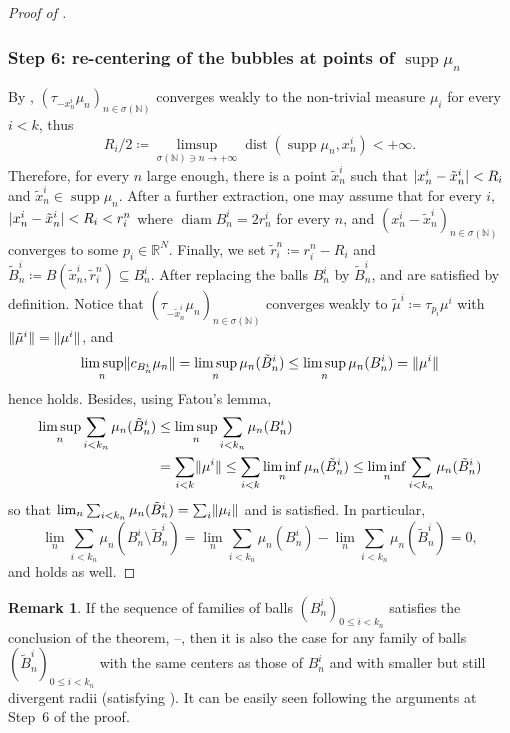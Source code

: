 \documentclass[JEP,XML,SOM,Unicode,published]{cedram}
\theoremstyle{plain}
\theoremstyle{definition}
\newtheorem{remark}[theorem]{Remark}
\newcommand{\N}{\mathbb{N}}
\newcommand{\R}{\mathbb{R}}
\DeclarePairedDelimiter{\abs}{\lvert}{\rvert}
\DeclarePairedDelimiter{\norm}{\lVert}{\rVert}
\DeclareMathOperator{\supp}{supp}
\DeclareMathOperator{\diam}{diam}
\DeclareMathOperator{\dist}{dist}
\begin{document}
\begin{proof}[Proof of ]
\subsubsection*{Step 6: re-centering of the bubbles at points of \(\supp\mu_n\)}
By , $(\tau_{-x^i_{n}} \mu_n)_{n \in \sigma(\N)}$ converges weakly to the non-trivial measure $\mu_i$ for every $i<k$, thus
\begin{equation}
\label{finiteDistance}
R_i/2\coloneqq \limsup_{\sigma(\N) \ni n \to +\infty} \dist(\supp \mu_n, x_n^i) < +\infty.
\end{equation}
Therefore, for every $n$ large enough, there is a point $\tilde x_n^i$ such that $\abs{x_n^i-\tilde x_n^i} < R_i$ and $\tilde x_n^i \in \supp \mu_n$. After a further extraction, one may assume that for every $i$, $\abs{x_n^i-\tilde x_n^i} < R_i < r_i^n$ where $\diam B_n^i = 2r_n^i$ for every $n$, and $(x_n^i -\tilde x_n^i)_{n\in \sigma(\N)}$ converges to some $p_i \in \R^N$. Finally, we set $\tilde r_i^n \coloneqq r_i^n-R_i$ and $\tilde B_n^i \coloneqq B(\tilde x_n^i,\tilde r_i^n) \subseteq B_n^i$. After replacing the balls $B_n^i$ by $\tilde B_n^i$,  and  are satisfied by definition. Notice that $(\tau_{-\tilde x^i_{n}} \mu_n)_{n \in \sigma(\N)}$ converges weakly to $\tilde \mu^i \coloneqq \tau_{p_i} \mu^i$ with $\norm{\tilde \mu^i} = \norm{\mu^i}$, and
\[
\limsup_n \norm{c_{B_n^i} \mu_n} = \limsup_n \mu_n(\tilde B_n^i) \leq \limsup_n \mu_n(B_n^i) = \norm{\mu^i}
\]
hence  holds. Besides, using Fatou's lemma,
\begin{align*}
\limsup_n \sum_{i<k_n} \mu_n(\tilde B_n^i) &\leq \limsup_n \sum_{i<k_n} \mu_n(B_n^i)\\
&= \sum_{i<k} \norm{\mu^i}\leq \sum_{i<k} \liminf_n \mu_n(\tilde B_n^i) \leq \liminf_n \sum_{i<k_n} \mu_n(\tilde B_n^i)
\end{align*}
so that $\lim_n \sum_{i<k_n} \mu_n(\tilde B_n^i) = \sum_i \norm{\mu_i}$ and  is satisfied. In particular,
\[\lim_n \sum_{i<k_n} \mu_n(B_n^i\setminus \tilde B_n^i) = \lim_n \sum_{i<k_n} \mu_n(B_n^i) - \lim_n \sum_{i<k_n} \mu_n(\tilde B_n^i) = 0,\]
and  holds as well.
\end{proof}
\begin{remark}\label{reduceRadius}
If the sequence of families of balls $(B^i_n)_{0 \leq i < k_n}$ satisfies the conclusion of the theorem, \ie {}--, then it is also the case for any family of balls $(\tilde B^i_n)_{0 \leq i < k_n}$ with the same centers as those of \(B^i_n\) and with smaller but still divergent radii (\ie satisfying ). It can be easily seen following the arguments at Step~6 of the proof.
\end{remark}
\end{document}
